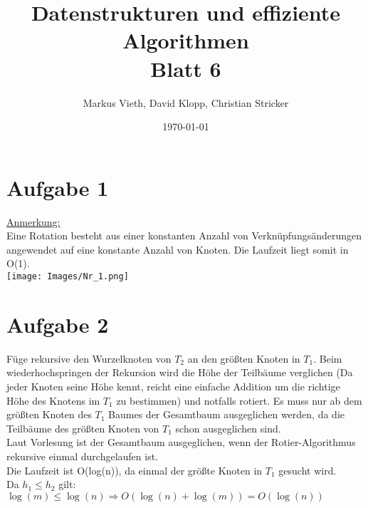 \documentclass[a4paper,11pt,twoside]{article}
\title{Datenstrukturen und effiziente Algorithmen\\ Blatt 6}
\author{Markus Vieth, David Klopp, Christian Stricker}
\date{\today}
\begin{document}
\maketitle
\cleardoublepage
\pagestyle{myheadings}

\section*{Aufgabe 1}
\underline{Anmerkung: }\\ Eine Rotation besteht aus einer konstanten Anzahl von Verknüpfungsänderungen angewendet auf eine konstante Anzahl von Knoten. Die Laufzeit liegt somit in O(1). \\
\texttt{[image: Images/Nr\_1.png]}

\section*{Aufgabe 2}
Füge rekursive den Wurzelknoten von $T_2$ an den größten Knoten in $T_1$. Beim wiederhochspringen der Rekursion wird die Höhe der Teilbäume verglichen (Da jeder Knoten seine Höhe kennt, reicht eine einfache Addition um die richtige Höhe des Knotens im $T_1$ zu bestimmen) und notfalls rotiert. Es muss nur ab dem größten Knoten des $T_1$ Baumes der Gesamtbaum ausgeglichen werden, da die Teilbäume des größten Knoten von $T_1$ schon ausgeglichen sind. \\
Laut Vorlesung ist der Gesamtbaum ausgeglichen, wenn der Rotier-Algorithmus rekursive einmal durchgelaufen ist. \\
Die Laufzeit ist O(log(n)), da einmal der größte Knoten in $T_1$ gesucht wird. \\
Da $h_1 \leq h_2$ gilt: $\log(m) \leq \log(n) \Rightarrow O(\log(n)+\log(m)) = O(\log(n)) $
\end{document}
